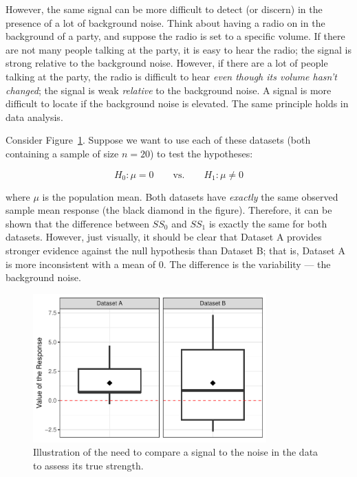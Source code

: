 \documentclass[
  letterpaper,
  DIV=11,
  numbers=noendperiod]{scrreprt}
\theoremstyle{definition}
\theoremstyle{definition}
\theoremstyle{plain}
\theoremstyle{remark}
\begin{document}
However, the same signal can be more difficult to detect (or discern) in
the presence of a lot of background noise. Think about having a radio on
in the background of a party, and suppose the radio is set to a specific
volume. If there are not many people talking at the party, it is easy to
hear the radio; the signal is strong relative to the background noise.
However, if there are a lot of people talking at the party, the radio is
difficult to hear \emph{even though its volume hasn't changed}; the
signal is weak \emph{relative} to the background noise. A signal is more
difficult to locate if the background noise is elevated. The same
principle holds in data analysis.

Consider Figure~\ref{fig-teststat-signal-to-noise}. Suppose we want to
use each of these datasets (both containing a sample of size \(n = 20\))
to test the hypotheses:

\[H_0: \mu = 0 \qquad \text{vs.} \qquad H_1: \mu \neq 0\]

where \(\mu\) is the population mean. Both datasets have \emph{exactly}
the same observed sample mean response (the black diamond in the
figure). Therefore, it can be shown that the difference between \(SS_0\)
and \(SS_1\) is exactly the same for both datasets. However, just
visually, it should be clear that Dataset A provides stronger evidence
against the null hypothesis than Dataset B; that is, Dataset A is more
inconsistent with a mean of 0. The difference is the variability --- the
background noise.

\begin{figure}

{\centering \includegraphics[width=0.8\textwidth,height=\textheight]{./images/fig-teststat-signal-to-noise-1.pdf}

}

\caption{\label{fig-teststat-signal-to-noise}Illustration of the need to
compare a signal to the noise in the data to assess its true strength.}

\end{figure}
\end{document}
